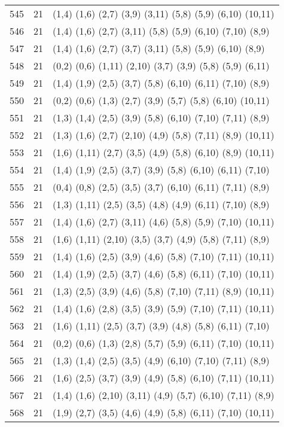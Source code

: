 {\begin{longtable}{lll}
545 & 21 & (1,4) (1,6) (2,7) (3,9) (3,11) (5,8) (5,9) (6,10) (10,11) \\
546 & 21 & (1,4) (1,6) (2,7) (3,11) (5,8) (5,9) (6,10) (7,10) (8,9) \\
547 & 21 & (1,4) (1,6) (2,7) (3,7) (3,11) (5,8) (5,9) (6,10) (8,9) \\
548 & 21 & (0,2) (0,6) (1,11) (2,10) (3,7) (3,9) (5,8) (5,9) (6,11) \\
549 & 21 & (1,4) (1,9) (2,5) (3,7) (5,8) (6,10) (6,11) (7,10) (8,9) \\
550 & 21 & (0,2) (0,6) (1,3) (2,7) (3,9) (5,7) (5,8) (6,10) (10,11) \\
551 & 21 & (1,3) (1,4) (2,5) (3,9) (5,8) (6,10) (7,10) (7,11) (8,9) \\
552 & 21 & (1,3) (1,6) (2,7) (2,10) (4,9) (5,8) (7,11) (8,9) (10,11) \\
553 & 21 & (1,6) (1,11) (2,7) (3,5) (4,9) (5,8) (6,10) (8,9) (10,11) \\
554 & 21 & (1,4) (1,9) (2,5) (3,7) (3,9) (5,8) (6,10) (6,11) (7,10) \\
555 & 21 & (0,4) (0,8) (2,5) (3,5) (3,7) (6,10) (6,11) (7,11) (8,9) \\
556 & 21 & (1,3) (1,11) (2,5) (3,5) (4,8) (4,9) (6,11) (7,10) (8,9) \\
557 & 21 & (1,4) (1,6) (2,7) (3,11) (4,6) (5,8) (5,9) (7,10) (10,11) \\
558 & 21 & (1,6) (1,11) (2,10) (3,5) (3,7) (4,9) (5,8) (7,11) (8,9) \\
559 & 21 & (1,4) (1,6) (2,5) (3,9) (4,6) (5,8) (7,10) (7,11) (10,11) \\
560 & 21 & (1,4) (1,9) (2,5) (3,7) (4,6) (5,8) (6,11) (7,10) (10,11) \\
561 & 21 & (1,3) (2,5) (3,9) (4,6) (5,8) (7,10) (7,11) (8,9) (10,11) \\
562 & 21 & (1,4) (1,6) (2,8) (3,5) (3,9) (5,9) (7,10) (7,11) (10,11) \\
563 & 21 & (1,6) (1,11) (2,5) (3,7) (3,9) (4,8) (5,8) (6,11) (7,10) \\
564 & 21 & (0,2) (0,6) (1,3) (2,8) (5,7) (5,9) (6,11) (7,10) (10,11) \\
565 & 21 & (1,3) (1,4) (2,5) (3,5) (4,9) (6,10) (7,10) (7,11) (8,9) \\
566 & 21 & (1,6) (2,5) (3,7) (3,9) (4,9) (5,8) (6,10) (7,11) (10,11) \\
567 & 21 & (1,4) (1,6) (2,10) (3,11) (4,9) (5,7) (6,10) (7,11) (8,9) \\
568 & 21 & (1,9) (2,7) (3,5) (4,6) (4,9) (5,8) (6,11) (7,10) (10,11) \\

\end{longtable}}
